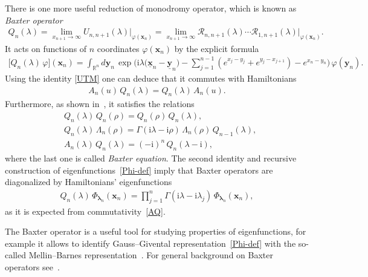 \documentclass[11pt]{article}
\numberwithin{equation}{section}
\theoremstyle{plain}
\theoremstyle{definition}
\renewcommand{\phi}{\varphi}
\renewcommand{\imath}{\mathrm{i}}
\begin{document}
There is one more useful reduction of monodromy operator, which is known as \textit{Baxter operator}
\begin{align} \label{Q-gl-def}
	Q_n(\lambda)  = \lim_{x_{n + 1} \to \infty} U_{n, n + 1}(\lambda) \bigr|_{\phi(\bm{x}_n)} = \lim_{x_{n + 1} \to \infty} \mathcal{R}_{n, n + 1}(\lambda) \cdots \mathcal{R}_{1, n + 1}(\lambda) \bigr|_{\phi(\bm{x}_n)}.
\end{align}
It acts on functions of $n$ coordinates $\phi(\bm{x}_n)$ by the explicit formula
\begin{align}
	\bigl[ Q_n(\lambda) \, \phi \bigr] (\bm{x}_n) = \int_{\mathbb{R}^{n}} d\bm{y}_{n} \,  \exp \biggl( \imath \lambda \bigl(\underline{\bm{x}}_n - \underline{\bm{y}}_{n} \bigr) - \sum_{j = 1}^{n - 1} (e^{x_j - y_j} + e^{y_j - x_{j + 1}}) - e^{x_n - y_n} \biggr) \,
	\phi(\bm{y}_{n}).
\end{align}
Using the identity \eqref{UTM} one can deduce that it commutes with Hamiltonians
\begin{align}\label{AQ}
	A_n(u) \, Q_n(\lambda) = Q_n(\lambda) \, A_n(u).
\end{align}
Furthermore, as shown in~\cite[Theorem 2.3]{GLO0}, it satisfies the relations
\begin{align}
	& Q_n(\lambda) \, Q_n(\rho) = Q_n(\rho) \, Q_n(\lambda), \\[6pt]
	& Q_n(\lambda) \, \Lambda_n(\rho) = \Gamma(\imath \lambda - \imath \rho) \, \Lambda_n(\rho) \, Q_{n - 1}(\lambda), \\[6pt]
	& A_n(\lambda) \, Q_n(\lambda) = (-\imath)^n \, Q_n(\lambda - \imath),
\end{align}
where the last one is called \textit{Baxter equation}. The second identity and recursive construction of eigenfunctions~\eqref{Phi-def} imply that Baxter operators are diagonalized by Hamiltonians' eigenfunctions
\begin{align} \label{Q-Phi}
	Q_n(\lambda) \, \Phi_{\bm{\lambda}_n}(\bm{x}_n) = \prod_{j = 1}^n \Gamma(\imath \lambda - \imath \lambda_j) \, \Phi_{\bm{\lambda}_n}(\bm{x}_n),
\end{align}
as it is expected from commutativity~\eqref{AQ}. 

The Baxter operator is a useful tool for studying properties of eigenfunctions, for example it allows to identify Gauss--Givental representation~\eqref{Phi-def} with the so-called Mellin--Barnes representation~\cite[Section 3]{GLO0}. For general background on Baxter operators see~\cite{KS,Skl2}. 
\end{document}
